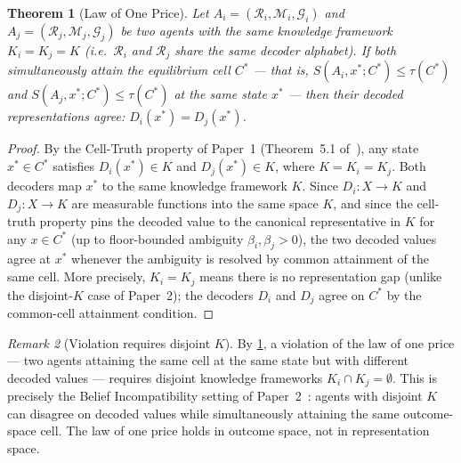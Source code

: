\documentclass[twocolumn,11pt,a4paper]{article}
\newtheorem{theorem}{Theorem}[section]
\theoremstyle{remark}
\newtheorem{remark}[theorem]{Remark}
\newcommand{\Rec}{\mathcal{R}}
\newcommand{\Meth}{\mathcal{M}}
\newcommand{\tol}{\tau}
\begin{document}
\begin{theorem}[Law of One Price]
\label{thm:loop}
Let $A_i = (\Rec_i, \Meth_i, \mathcal{G}_i)$ and $A_j = (\Rec_j, \Meth_j,
\mathcal{G}_j)$ be two agents with the same knowledge framework
$K_i = K_j = K$ (i.e.\ $\Rec_i$ and $\Rec_j$ share the same decoder
alphabet).  If both simultaneously attain the equilibrium cell $C^*$ ---
that is, $S(A_i, x^*; C^*) \le \tol(C^*)$ and $S(A_j, x^*; C^*) \le
\tol(C^*)$ at the same state $x^*$ --- then their decoded representations
agree: $D_i(x^*) = D_j(x^*)$.
\end{theorem}
\begin{proof}
By the Cell-Truth property of Paper~1 (Theorem~5.1
of~\cite{sachikonye2025agents}), any state $x^* \in C^*$ satisfies
$D_i(x^*) \in K$ and $D_j(x^*) \in K$, where $K = K_i = K_j$.  Both
decoders map $x^*$ to the same knowledge framework $K$.  Since $D_i: X \to K$
and $D_j: X \to K$ are measurable functions into the same space $K$, and
since the cell-truth property pins the decoded value to the canonical
representative in $K$ for any $x \in C^*$ (up to floor-bounded ambiguity
$\beta_i, \beta_j > 0$), the two decoded values agree at $x^*$ whenever the
ambiguity is resolved by common attainment of the same cell.  More precisely,
$K_i = K_j$ means there is no representation gap (unlike the disjoint-$K$
case of Paper~2); the decoders $D_i$ and $D_j$ agree on $C^*$ by the
common-cell attainment condition.
\end{proof}

\begin{remark}[Violation requires disjoint $K$]
By \cref{thm:loop}, a violation of the law of one price --- two agents
attaining the same cell at the same state but with different decoded values
--- requires disjoint knowledge frameworks $K_i \cap K_j = \emptyset$.
This is precisely the Belief Incompatibility setting of
Paper~2~\cite{sachikonye2025market}: agents with disjoint $K$ can disagree
on decoded values while simultaneously attaining the same outcome-space
cell.  The law of one price holds in outcome space, not in representation
space.
\end{remark}
\end{document}
